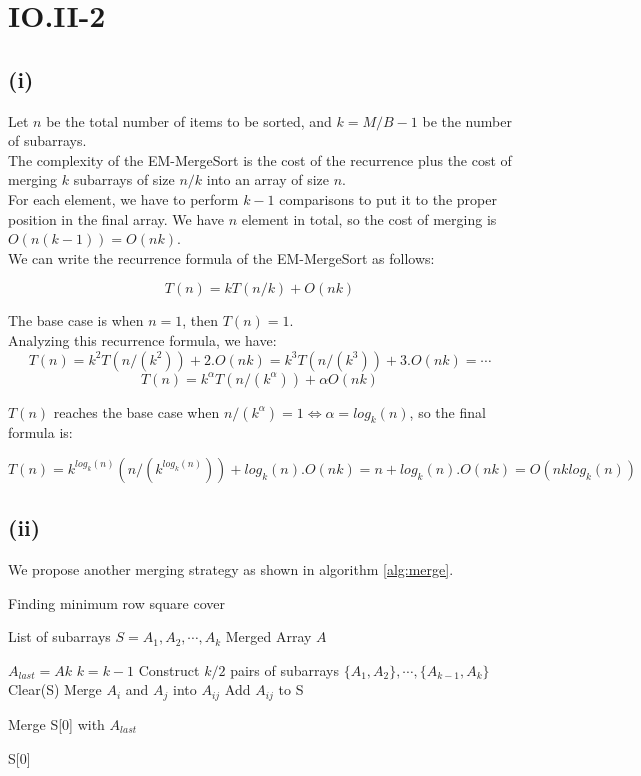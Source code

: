 \section*{IO.II-2}
\subsection*{(i)}
Let $n$ be the total number of items to be sorted, and $k = M/B - 1$ be the number of subarrays.\\

The complexity of the EM-MergeSort is the cost of the recurrence plus the cost of merging $k$ subarrays of size $n/k$ into an array of size $n$. \\ 

For each element, we have to perform $k-1$ comparisons to put it to the proper position in the final array. We have $n$ element in total, so the cost of merging is $O(n(k - 1)) = O(nk)$.\\

We can write the recurrence formula of the EM-MergeSort as follows:

$$T(n) = kT(n/k) + O(nk)$$

The base case is when $n = 1$, then $T(n) = 1$.\\

Analyzing this recurrence formula, we have:\\

$$T(n) = k^2T(n/(k^2)) + 2.O(nk) = k^3T(n/(k^3)) + 3.O(nk) = \cdots$$
$$T(n) = k^\alpha T(n/(k^\alpha)) + \alpha O(nk)$$

$T(n)$ reaches the base case when $n/(k^\alpha) = 1 \iff \alpha = log_k(n)$, so the final formula is:

$$T(n) = k^{log_k(n)} (n/(k^{log_k(n)})) + log_k(n).O(nk) = n + log_k(n).O(nk) = O(nklog_k(n))$$

\subsection*{(ii)}
We propose another merging strategy as shown in algorithm \ref{alg:merge}.

\begin{algorithm}[h]
  \caption{Finding minimum row square cover}
  \label{alg:merge}
  \begin{algorithmic}
    \Require List of subarrays $S = {A_1, A_2, \cdots, A_k}$
    \Ensure Merged Array $A$

  \State $A_{last} = A{k}$
  \State $k = k - 1$
  \EndIf
  \State Construct $k/2$ pairs of subarrays $\{A_1, A_2\},\cdots, \{A_{k - 1}, A_k\}$
  \State Clear(S)
  \State Merge $A_i$ and $A_j$ into $A_{ij}$
  \State Add $A_{ij}$ to S
  \EndFor
  \EndWhile

  \State Merge S[0] with $A_{last}$
  \EndIf

  \Return S[0]
\end{algorithmic}
\end{algorithm}

